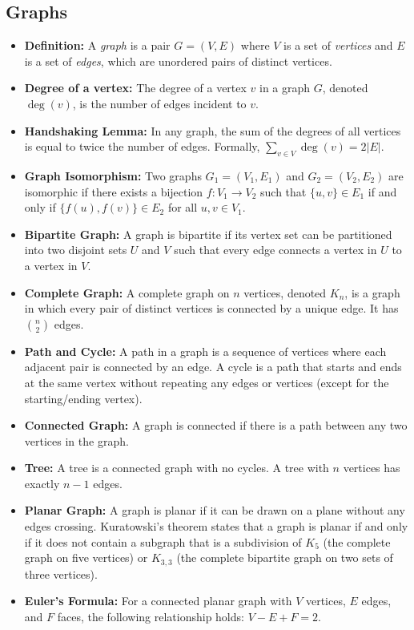 \subsection{Graphs}

\begin{itemize}
    \item \textbf{Definition: }A \textit{graph} is a pair $G = (V, E)$ where $V$ is a set of \textit{vertices} and $E$ is a set of \textit{edges}, which are unordered pairs of distinct vertices.
    \item \textbf{Degree of a vertex: }The degree of a vertex $v$ in a graph $G$, denoted $\deg(v)$, is the number of edges incident to $v$.
    \item \textbf{Handshaking Lemma: }In any graph, the sum of the degrees of all vertices is equal to twice the number of edges. Formally, $\sum_{v \in V} \deg(v) = 2|E|$.
    \item \textbf{Graph Isomorphism: }Two graphs $G_1 = (V_1, E_1)$ and $G_2 = (V_2, E_2)$ are isomorphic if there exists a bijection $f: V_1 \to V_2$ such that $\{u, v\} \in E_1$ if and only if $\{f(u), f(v)\} \in E_2$ for all $u, v \in V_1$.
    \item \textbf{Bipartite Graph: }A graph is bipartite if its vertex set can be partitioned into two disjoint sets $U$ and $V$ such that every edge connects a vertex in $U$ to a vertex in $V$.
    \item \textbf{Complete Graph: }A complete graph on $n$ vertices, denoted $K_n$, is a graph in which every pair of distinct vertices is connected by a unique edge. It has $\binom{n}{2}$ edges.
    \item \textbf{Path and Cycle: }A path in a graph is a sequence of vertices where each adjacent pair is connected by an edge. A cycle is a path that starts and ends at the same vertex without repeating any edges or vertices (except for the starting/ending vertex).
    \item \textbf{Connected Graph: }A graph is connected if there is a path between any two vertices in the graph.
    \item \textbf{Tree: }A tree is a connected graph with no cycles. A tree with $n$ vertices has exactly $n-1$ edges.
    \item \textbf{Planar Graph: }A graph is planar if it can be drawn on a plane without any edges crossing. Kuratowski's theorem states that a graph is planar if and only if it does not contain a subgraph that is a subdivision of $K_5$ (the complete graph on five vertices) or $K_{3,3}$ (the complete bipartite graph on two sets of three vertices).
    \item \textbf{Euler's Formula: }For a connected planar graph with $V$ vertices, $E$ edges, and $F$ faces, the following relationship holds: $V - E + F = 2$.
\end{itemize}